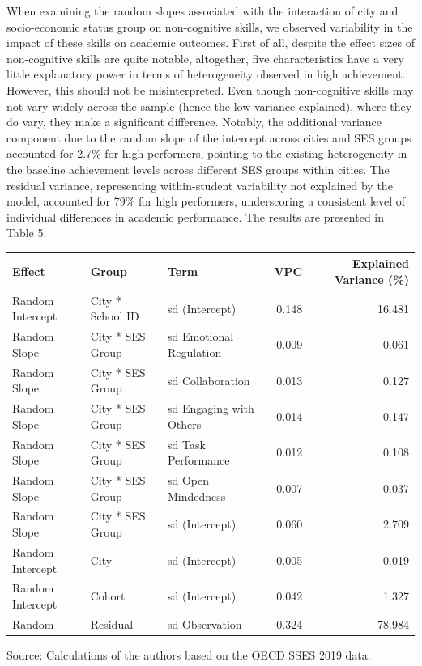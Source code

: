 \documentclass[
  12pt,
  a4paper,
]{article}
\begin{document}
When examining the random slopes associated with the interaction of city
and socio-economic status group on non-cognitive skills, we observed
variability in the impact of these skills on academic outcomes. First of
all, despite the effect sizes of non-cognitive skills are quite notable,
altogether, five characteristics have a very little explanatory power in
terms of heterogeneity observed in high achievement. However, this
should not be misinterpreted. Even though non-cognitive skills may not
vary widely across the sample (hence the low variance explained), where
they do vary, they make a significant difference. Notably, the
additional variance component due to the random slope of the intercept
across cities and SES groups accounted for 2.7\% for high performers,
pointing to the existing heterogeneity in the baseline achievement
levels across different SES groups within cities. The residual variance,
representing within-student variability not explained by the model,
accounted for 79\% for high performers, underscoring a consistent level
of individual differences in academic performance. The results are
presented in Table 5.

\setlength{\LTpost}{0mm}
\begin{longtable}{lllrr}
\toprule
Effect & Group & Term & VPC & Explained Variance (\%) \\ 
\midrule\addlinespace[2.5pt]
Random Intercept & City * School ID & sd (Intercept) & 0.148 & 16.481 \\ 
Random Slope & City * SES Group & sd Emotional Regulation & 0.009 & 0.061 \\ 
Random Slope & City * SES Group & sd Collaboration & 0.013 & 0.127 \\ 
Random Slope & City * SES Group & sd Engaging with Others & 0.014 & 0.147 \\ 
Random Slope & City * SES Group & sd Task Performance & 0.012 & 0.108 \\ 
Random Slope & City * SES Group & sd Open Mindedness & 0.007 & 0.037 \\ 
Random Slope & City * SES Group & sd (Intercept) & 0.060 & 2.709 \\ 
Random Intercept & City & sd (Intercept) & 0.005 & 0.019 \\ 
Random Intercept & Cohort & sd (Intercept) & 0.042 & 1.327 \\ 
Random & Residual & sd Observation & 0.324 & 78.984 \\ 
\bottomrule
\end{longtable}
\begin{minipage}{\linewidth}
Source: Calculations of the authors based on the OECD SSES 2019 data.\\
\end{minipage}
\end{document}
